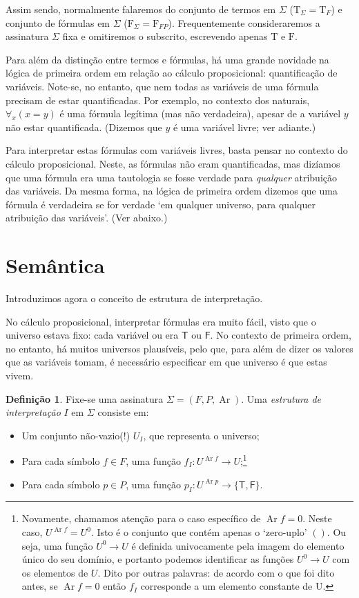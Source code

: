 \documentclass{report}
\theoremstyle{definition}
\newtheorem{definicao}{Definição}
\theoremstyle{remark}
\newcommand{\F}{\mathrm{F}}
\newcommand{\T}{\mathrm{T}}
\newcommand{\lt}{\mathsf{T}}
\newcommand{\lf}{\mathsf{F}}
\DeclareMathOperator{\ar}{Ar}
\begin{document}
	Assim sendo, normalmente falaremos do conjunto de termos em $\Sigma$ ($\T_\Sigma = \T_F$) e conjunto de fórmulas em $\Sigma$ ($\F_\Sigma = \F_{FP}$). Frequentemente consideraremos a assinatura $\Sigma$ fixa e omitiremos o subscrito, escrevendo apenas $\T$ e $\F$.
	
	Para além da distinção entre termos e fórmulas, há uma grande novidade na lógica de primeira ordem em relação ao cálculo proposicional: quantificação de variáveis. Note-se, no entanto, que nem todas as variáveis de uma fórmula precisam de estar quantificadas. Por exemplo, no contexto dos naturais, $\forall_x (x = y)$ é uma fórmula legítima (mas não verdadeira), apesar de a variável $y$ não estar quantificada. (Dizemos que $y$ é uma variável livre; ver adiante.)
	
	Para interpretar estas fórmulas com variáveis livres, basta pensar no contexto do cálculo proposicional. Neste, as fórmulas não eram quantificadas, mas dizíamos que uma fórmula era uma tautologia se fosse verdade para \emph{qualquer} atribuição das variáveis. Da mesma forma, na lógica de primeira ordem dizemos que uma fórmula é verdadeira se for verdade `em qualquer universo, para qualquer atribuição das variáveis'. (Ver abaixo.)
	
	\section{Semântica}
	
	Introduzimos agora o conceito de estrutura de interpretação.
	
	No cálculo proposicional, interpretar fórmulas era muito fácil, visto que o universo estava fixo: cada variável ou era $\lt$ ou $\lf$. No contexto de primeira ordem, no entanto, há muitos universos plausíveis, pelo que, para além de dizer os valores que as variáveis tomam, é necessário especificar em que universo é que estas vivem.
	
	\begin{definicao}	
	Fixe-se uma assinatura $\Sigma = (F, P, \ar)$. Uma \emph{estrutura de interpretação} $I$ em $\Sigma$ consiste em:
	
	\begin{itemize}
	\item Um conjunto não-vazio(!) $U_I$, que representa o universo;
	
	\item Para cada símbolo $f \in F$, uma função $f_I : U^{\ar f} \to U$;\footnote{Novamente, chamamos atenção para o caso específico de $\ar f = 0$. Neste caso, $U^{\ar f} = U^0$. Isto é o conjunto que contém apenas o `zero-uplo' $()$. Ou seja, uma função $U^0 \to U$ é definida univocamente pela imagem do elemento único do seu domínio, e portanto podemos identificar as funções $U^0 \to U$ com os elementos de $U$. Dito por outras palavras: de acordo com o que foi dito antes, se $\ar f = 0$ então $f_I$ corresponde a um elemento constante de U.}
	
	\item Para cada símbolo $p \in P$, uma função $p_I : U^{\ar p} \to \{\lt, \lf\}$.
	\end{itemize}
	\end{definicao}
	
\end{document}
